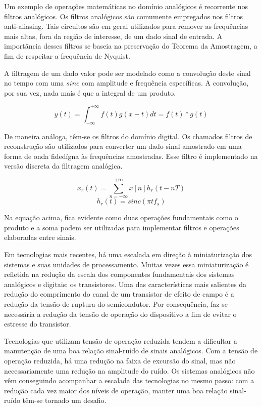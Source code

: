 \documentclass[
	12pt,				%
	openright,			%
	twoside,			%
	a4paper,			%
	english,			%
	french,				%
	spanish,			%
	brazil,				%
	]{abntex2}
\begin{document}
    Um exemplo de operações matemáticas no domínio analógicos é recorrente nos filtros analógicos. Os filtros analógicos são comumente empregados nos filtros anti-aliasing. Tais circuitos são em geral utilizados para remover as frequências mais altas, fora da região de interesse, de um dado sinal de entrada. A importância desses filtros se baseia na preservação do Teorema da Amostragem, a fim de respeitar a frequência de Nyquist\cite{nyquist}.

    A filtragem de um dado valor pode ser modelado como a convolução deste sinal no tempo com uma $sinc$ com amplitude e frequência específicas. A convolução, por sua vez, nada mais é que a integral de um produto\cite{Oppenheim}.
	
	$$y(t)=\int_{-\infty}^{+\infty} f(t)g(x-t)dt=f(t)*g(t)$$

    De maneira análoga, têm-se os filtros do domínio digital. Os chamados filtros de reconstrução são utilizados para converter um dado sinal amostrado em uma forma de onda fidedígna às frequências amostradas. Esse filtro é implementado na versão discreta da filtragem analógica\cite{Oppenheim}.

	$$x_r(t)=\sum_{n=-\infty}^{+\infty} x[n]h_r(t-nT)$$
	$$h_r(t)=sinc(\pi t f_s)$$

    Na equação acima, fica evidente como duas operações fundamentais como o produto e a soma podem ser utilizadas para implementar filtros e operações elaboradas entre sinais.

	Em tecnologias mais recentes, há uma escalada em direção à miniaturização dos sistemas e suas unidades de processamento\cite{kuo}. Muitas vezes essa miniaturização é refletida na redução da escala dos componentes fundamentais dos sistemas analógicos e digitais: os transistores. Uma das características mais salientes da redução do comprimento do canal de um transistor de efeito de campo é a redução da tensão de ruptura do semicondutor\cite{Sze}. Por consequência, faz-se necessária a redução da tensão de operação do dispositivo a fim de evitar o estresse do transistor\cite{kuo}.

	Tecnologias que utilizam tensão de operação reduzida tendem a dificultar a manutenção de uma boa relação sinal-ruído de sinais analógicos. Com a tensão de operação reduzida, há uma redução na faixa de excursão do sinal, mas não necessariamente uma redução na amplitude do ruído. Os sistemas analógicos não vêm conseguindo acompanhar a escalada das tecnologias no mesmo passo: com a redução cada vez maior dos níveis de operação, manter uma boa relação sinal-ruído têm-se tornado um desafio. \cite{kuo}
\end{document}
